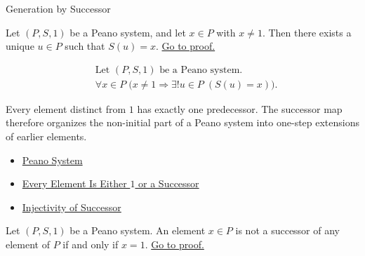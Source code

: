 \begin{topicbox}{Generation by Successor}
\begin{tcolorbox}[colback=thmbox, colframe=thmborder, arc=2pt,
  left=6pt, right=6pt, top=4pt, bottom=4pt,
  title={\small\textbf{Theorem (Predecessor Existence and Uniqueness Away from \texorpdfstring{$1$}{1})}} ,
  fonttitle=\small\bfseries]
\begin{theorem}
\label{thm:predecessor-exists-unique-away-from-one}
Let $(P,S,1)$ be a Peano system, and let $x \in P$ with $x \neq 1$. Then
there exists a unique $u \in P$ such that $S(u)=x$.
\hyperref[prf-predecessor-exists-unique-away-from-one]{Go to proof.}
\end{theorem}
\end{tcolorbox}

\begin{remark*}
\[
\begin{aligned}
&\text{Let } (P,S,1) \text{ be a Peano system.}\\
&\forall x \in P\;\bigl(x \neq 1 \Longrightarrow \exists! u \in P\;(S(u)=x)\bigr).
\end{aligned}
\]
\end{remark*}

\begin{remark*}[Interpretation]
Every element distinct from $1$ has exactly one predecessor. The successor map
therefore organizes the non-initial part of a Peano system into one-step
extensions of earlier elements.
\end{remark*}

\begin{remark*}[Dependencies]
\begin{itemize}
  \item \hyperref[def:peano-system]{Peano System}
  \item \hyperref[thm:every-element-is-one-or-a-successor]{Every Element Is Either $1$ or a Successor}
  \item \hyperref[ax:peano-successor-injective]{Injectivity of Successor}
\end{itemize}
\end{remark*}

\begin{tcolorbox}[colback=propbox, colframe=propborder, arc=2pt,
  left=6pt, right=6pt, top=4pt, bottom=4pt,
  title={\small\textbf{Corollary (The Distinguished Element Is the Unique Non-Successor)}} ,
  fonttitle=\small\bfseries]
\begin{corollary}
\label{cor:one-is-unique-non-successor}
Let $(P,S,1)$ be a Peano system. An element $x \in P$ is not a successor of
any element of $P$ if and only if $x=1$.
\hyperref[prf-one-is-unique-non-successor]{Go to proof.}
\end{corollary}
\end{tcolorbox}


\end{topicbox}
